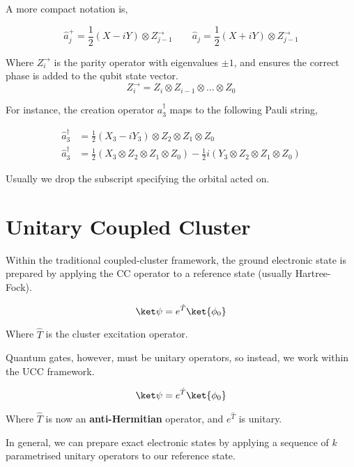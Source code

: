 A more compact notation is,

\begin{equation*}
    \hat a_j^+ = \frac{1}{2} (X - iY) \otimes Z^\rightarrow_{j-1} \qquad
    \hat a_j = \frac{1}{2} (X + iY) \otimes Z^\rightarrow_{j-1}
\end{equation*}\medskip

Where $Z^\rightarrow_{i}$ is the parity operator with eigenvalues $\pm 1$, and ensures the correct phase is added to the qubit state vector.
\begin{equation*}
    Z^\rightarrow_{i} = Z_i \otimes Z_{i-1} \otimes \dots \otimes Z_0
\end{equation*}

For instance, the creation operator $a^\dagger_3$ maps to the following Pauli string,

\begin{align*}
    \hat a_3^\dagger &=
    \frac{1}{2} (X_3 - iY_3) \otimes Z_2 \otimes Z_1 \otimes Z_0 \\
    \hat a_3^\dagger &=
    \frac{1}{2} ( X_3 \otimes Z_2 \otimes Z_1 \otimes Z_0 ) -
    \frac{1}{2} i ( Y_3 \otimes Z_2 \otimes Z_1 \otimes Z_0 )
\end{align*}

Usually we drop the subscript specifying the orbital acted on.

\section{Unitary Coupled Cluster}

Within the traditional coupled-cluster framework, the ground electronic state is prepared by applying the CC operator to a reference state (usually Hartree-Fock).

\begin{equation*}
    \ket\psi = e^{\hat T} \ket{\phi_0}
\end{equation*}

Where $\hat T$ is the cluster excitation operator.

Quantum gates, however, must be unitary operators, so instead, we work within the UCC framework.

\begin{equation*}
    \ket\psi = e^{\hat T} \ket{\phi_0}
\end{equation*}

Where $\hat T$ is now an \textbf{anti-Hermitian} operator, and $e^{\hat T}$ is unitary.

In general, we can prepare exact electronic states by applying a sequence of $k$ parametrised unitary operators to our reference state.

